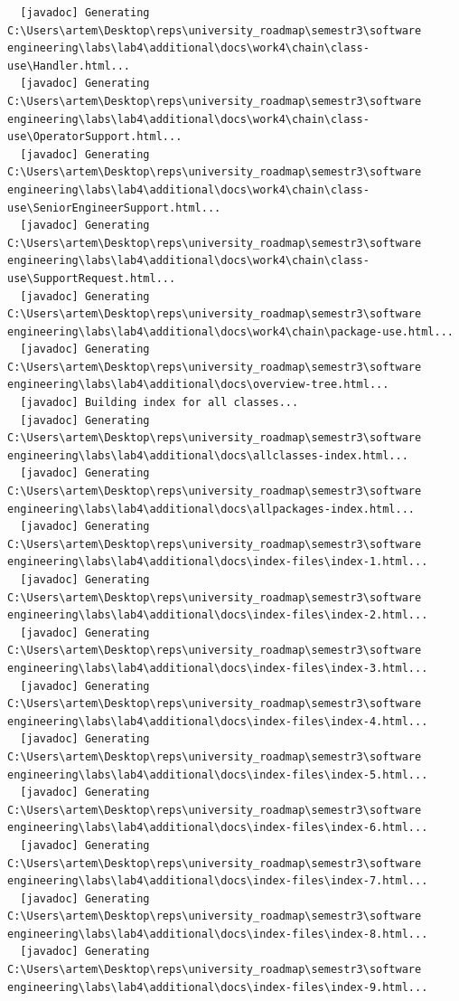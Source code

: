 \documentclass[12pt,a4paper]{article}
\begin{document}
\begin{verbatim}
  [javadoc] Generating C:\Users\artem\Desktop\reps\university_roadmap\semestr3\software engineering\labs\lab4\additional\docs\work4\chain\class-use\Handler.html...
  [javadoc] Generating C:\Users\artem\Desktop\reps\university_roadmap\semestr3\software engineering\labs\lab4\additional\docs\work4\chain\class-use\OperatorSupport.html...
  [javadoc] Generating C:\Users\artem\Desktop\reps\university_roadmap\semestr3\software engineering\labs\lab4\additional\docs\work4\chain\class-use\SeniorEngineerSupport.html...
  [javadoc] Generating C:\Users\artem\Desktop\reps\university_roadmap\semestr3\software engineering\labs\lab4\additional\docs\work4\chain\class-use\SupportRequest.html...
  [javadoc] Generating C:\Users\artem\Desktop\reps\university_roadmap\semestr3\software engineering\labs\lab4\additional\docs\work4\chain\package-use.html...
  [javadoc] Generating C:\Users\artem\Desktop\reps\university_roadmap\semestr3\software engineering\labs\lab4\additional\docs\overview-tree.html...
  [javadoc] Building index for all classes...
  [javadoc] Generating C:\Users\artem\Desktop\reps\university_roadmap\semestr3\software engineering\labs\lab4\additional\docs\allclasses-index.html...
  [javadoc] Generating C:\Users\artem\Desktop\reps\university_roadmap\semestr3\software engineering\labs\lab4\additional\docs\allpackages-index.html...
  [javadoc] Generating C:\Users\artem\Desktop\reps\university_roadmap\semestr3\software engineering\labs\lab4\additional\docs\index-files\index-1.html...
  [javadoc] Generating C:\Users\artem\Desktop\reps\university_roadmap\semestr3\software engineering\labs\lab4\additional\docs\index-files\index-2.html...
  [javadoc] Generating C:\Users\artem\Desktop\reps\university_roadmap\semestr3\software engineering\labs\lab4\additional\docs\index-files\index-3.html...
  [javadoc] Generating C:\Users\artem\Desktop\reps\university_roadmap\semestr3\software engineering\labs\lab4\additional\docs\index-files\index-4.html...
  [javadoc] Generating C:\Users\artem\Desktop\reps\university_roadmap\semestr3\software engineering\labs\lab4\additional\docs\index-files\index-5.html...
  [javadoc] Generating C:\Users\artem\Desktop\reps\university_roadmap\semestr3\software engineering\labs\lab4\additional\docs\index-files\index-6.html...
  [javadoc] Generating C:\Users\artem\Desktop\reps\university_roadmap\semestr3\software engineering\labs\lab4\additional\docs\index-files\index-7.html...
  [javadoc] Generating C:\Users\artem\Desktop\reps\university_roadmap\semestr3\software engineering\labs\lab4\additional\docs\index-files\index-8.html...
  [javadoc] Generating C:\Users\artem\Desktop\reps\university_roadmap\semestr3\software engineering\labs\lab4\additional\docs\index-files\index-9.html...

\end{verbatim}
\end{document}
